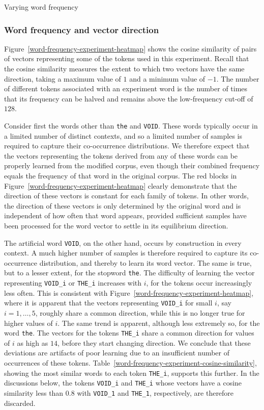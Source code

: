 \documentclass{article} %
\newcommand{\word}[1]{\texttt{#1}}
\begin{document}
\begin{section}{Varying word frequency}
\subsubsection{Word frequency and vector direction}\label{WFVE-direction}
Figure~\ref{word-frequency-experiment-heatmap} shows the cosine
similarity of pairs of vectors representing some of the tokens used in
this experiment.  Recall that the cosine similarity measures the extent
to which two vectors have the same direction, taking a maximum value of
$1$ and a minimum value of $-1$.  The number of different tokens
associated with an experiment word is the number of times that its
frequency can be halved and remains above the low-frequency cut-off of
$128$.

Consider first the words other than \word{the} and \word{VOID}.  These
words typically occur in a limited number of distinct contexts, and so a
limited number of samples is required to capture their co-occurrence
distributions.  We therefore expect that the vectors representing the
tokens derived from any of these words can be properly learned from the
modified corpus, even though their combined frequency equals the
frequency of that word in the original corpus.  The red blocks in
Figure~\ref{word-frequency-experiment-heatmap} clearly demonstrate that
the direction of these vectors is constant for each family of tokens.
In other words, the direction of these vectors is only determined by the
original word and is independent of how often that word appears,
provided sufficient samples have been processed for the word vector to
settle in its equilibrium direction.

The artificial word \word{VOID}, on the other hand, occurs by
construction in every context.  A much higher number of samples is
therefore required to capture its co-occurrence distribution, and
thereby to learn its word vector.  The same is true, but to a lesser
extent, for the stopword \word{the}.  The difficulty of learning the
vector representing \word{VOID\_i} or \word{THE\_i} increases with $i$,
for the tokens occur increasingly less often.  This is consistent with
Figure~\ref{word-frequency-experiment-heatmap}, where it is apparent
that the vectors representing \word{VOID\_i} for small $i$, say $i = 1,
\dots, 5$, roughly share a common direction, while this is no longer
true for higher values of $i$.  The same trend is apparent, although
less extremely so, for the word \word{the}.  The vectors for the tokens
\word{THE\_i} share a common direction for values of $i$ as high as
$14$, before they start changing direction.  We conclude that these
deviations are artifacts of poor learning due to an insufficient number
of occurrences of these tokens.
Table~\ref{word-frequency-experiment-cosine-similarity}, showing the
most similar words to each token \word{THE\_i}, supports this further.
In the discussions below, the tokens \word{VOID\_i} and \word{THE\_i}
whose vectors have a cosine similarity less than $0.8$ with
\word{VOID\_1} and \word{THE\_1}, respectively, are therefore discarded.


\end{section}
\end{document}
